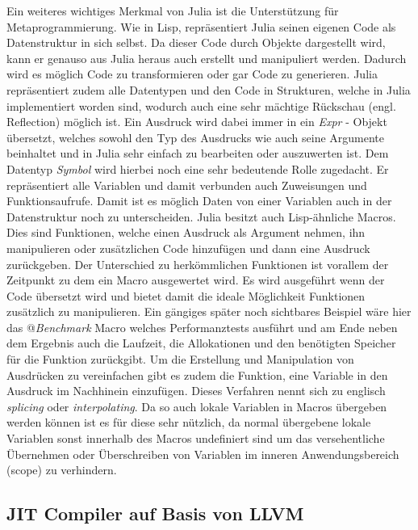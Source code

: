 \documentclass[proseminar,german,utf8]{zihpub}
\begin{document}
Ein weiteres wichtiges Merkmal von Julia ist die Unterstützung für Metaprogrammierung. Wie in Lisp, repräsentiert Julia seinen eigenen Code als Datenstruktur in sich selbst. Da dieser Code durch Objekte dargestellt wird, kann er genauso aus Julia heraus auch erstellt und manipuliert werden. Dadurch wird es möglich Code zu transformieren oder gar Code zu generieren. Julia repräsentiert zudem alle Datentypen und den Code in Strukturen, welche in Julia implementiert worden sind, wodurch auch eine sehr mächtige Rückschau (engl. Reflection) möglich ist. Ein Ausdruck wird dabei immer in ein \textit{Expr} - Objekt übersetzt, welches sowohl den Typ des Ausdrucks wie auch seine Argumente beinhaltet und in Julia sehr einfach zu bearbeiten oder auszuwerten ist. Dem Datentyp \textit{Symbol} wird hierbei noch eine sehr bedeutende Rolle zugedacht. Er repräsentiert alle Variablen und damit verbunden auch Zuweisungen und Funktionsaufrufe. Damit ist es möglich Daten von einer Variablen auch in der Datenstruktur noch zu unterscheiden. Julia besitzt auch Lisp-ähnliche Macros. Dies sind Funktionen, welche einen Ausdruck als Argument nehmen, ihn manipulieren oder zusätzlichen Code hinzufügen und dann eine Ausdruck zurückgeben. Der Unterschied zu herkömmlichen Funktionen ist vorallem der Zeitpunkt zu dem ein Macro ausgewertet wird. Es wird ausgeführt wenn der Code übersetzt wird und bietet damit die ideale Möglichkeit Funktionen zusätzlich zu manipulieren. Ein gängiges später noch sichtbares Beispiel wäre hier das @\textit{Benchmark} Macro welches Performanztests ausführt und am Ende neben dem Ergebnis auch die Laufzeit, die Allokationen und den benötigten Speicher für die Funktion zurückgibt. Um die Erstellung und Manipulation von Ausdrücken zu vereinfachen gibt es zudem die Funktion, eine Variable in den Ausdruck im Nachhinein einzufügen. Dieses Verfahren nennt sich zu englisch \textit{splicing} oder \textit{interpolating}. Da so auch lokale Variablen in Macros übergeben werden können ist es für diese sehr nützlich, da normal übergebene lokale Variablen sonst innerhalb des Macros undefiniert sind um das versehentliche Übernehmen oder Überschreiben von Variablen im inneren Anwendungsbereich (scope) zu verhindern.

\subsection{JIT Compiler auf Basis von LLVM}
\end{document}
